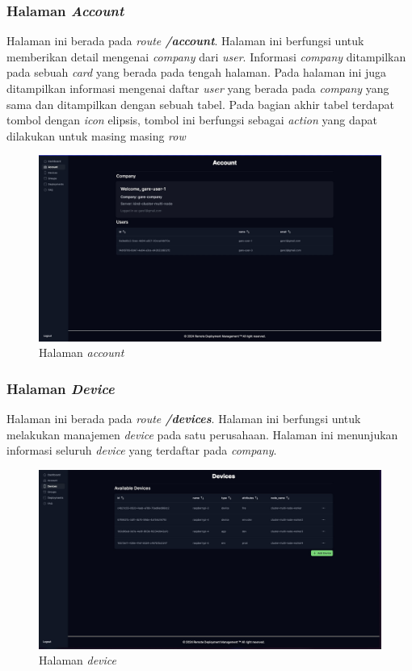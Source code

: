 \subsubsection{Halaman \textit{Account}}
Halaman ini berada pada \textit{route \textbf{/account}}. Halaman ini berfungsi untuk memberikan detail mengenai \textit{company} dari \textit{user}. Informasi \textit{company} ditampilkan pada sebuah \textit{card} yang berada pada tengah halaman. Pada halaman ini juga ditampilkan informasi mengenai daftar \textit{user} yang berada pada \textit{company} yang sama dan ditampilkan dengan sebuah tabel. Pada bagian akhir tabel terdapat tombol dengan \textit{icon} elipsis, tombol ini berfungsi sebagai \textit{action} yang dapat dilakukan untuk masing masing \textit{row}

\begin{figure}[h]
  \centering
  \includegraphics[width=1\textwidth]{resources/chapter-4/dashboard/account-page.jpg}
  \caption{Halaman \textit{account}}
  \label{fig:halaman-account}
\end{figure}

\subsubsection{Halaman \textit{Device}}
Halaman ini berada pada \textit{route \textbf{/devices}}. Halaman ini berfungsi untuk melakukan manajemen \textit{device} pada satu perusahaan. Halaman ini menunjukan informasi seluruh \textit{device} yang terdaftar pada \textit{company}.

\begin{figure}[h]
  \centering
  \includegraphics[width=1\textwidth]{resources/chapter-4/dashboard/device-page.jpg}
  \caption{Halaman \textit{device}}
  \label{fig:halaman-device}
\end{figure}

